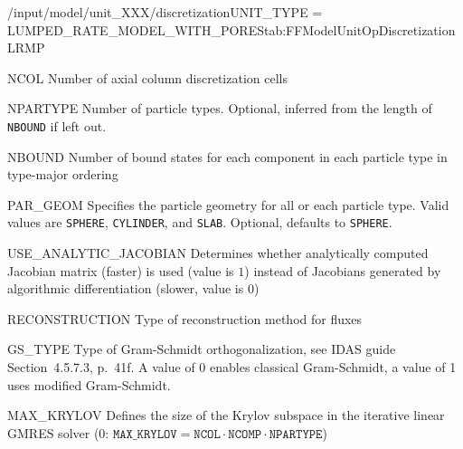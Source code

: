 \begin{condsubgroup}{/input/model/unit\_XXX/discretization}{UNIT\_TYPE = LUMPED\_RATE\_MODEL\_WITH\_PORES}{tab:FFModelUnitOpDiscretizationLRMP}
  \begin{dataset}[type=int,range={$\geq 1$},length=1]{NCOL}
    Number of axial column discretization cells
  \end{dataset}
  \begin{dataset}[type=int,range={$\geq 1$},length=1]{NPARTYPE}
    Number of particle types.
    Optional, inferred from the length of \texttt{NBOUND} if left out.
  \end{dataset}
  \begin{dataset}[type=int,range={$\geq 0$},length={\texttt{NCOMP} / $\texttt{NPARTYPE} \cdot \texttt{NCOMP}$}]{NBOUND}
    Number of bound states for each component in each particle type in type-major ordering
  \end{dataset}
  \begin{dataset}[type=string,range={$\{ \texttt{SPHERE}, \texttt{CYLINDER}, \texttt{SLAB} \}$},length={$1$ / \texttt{NPARTYPE}}]{PAR\_GEOM}
    Specifies the particle geometry for all or each particle type.
    Valid values are \texttt{SPHERE}, \texttt{CYLINDER}, and \texttt{SLAB}.
    Optional, defaults to \texttt{SPHERE}.
  \end{dataset}
  \begin{dataset}[type=int,range={$\{0, 1\}$},length=1]{USE\_ANALYTIC\_JACOBIAN}
    Determines whether analytically computed Jacobian matrix (faster) is used (value is $1$) instead of Jacobians generated by algorithmic differentiation (slower, value is $0$)
  \end{dataset}
  \begin{dataset}[type=string,range={\texttt{WENO}},length={1}]{RECONSTRUCTION}
    Type of reconstruction method for fluxes
  \end{dataset}
  \begin{dataset}[type=int,range={$\{0, 1\}$},length=1]{GS\_TYPE}
    Type of Gram-Schmidt orthogonalization, see IDAS guide Section~4.5.7.3, p.~41f.
    A value of $0$ enables classical Gram-Schmidt, a value of 1 uses modified Gram-Schmidt.
  \end{dataset}
  \begin{dataset}[type=int,range={$\{0, \dots, \texttt{NCOL} \cdot \texttt{NCOMP} \cdot \texttt{NPARTYPE} \}$},length=1]{MAX\_KRYLOV}
    Defines the size of the Krylov subspace in the iterative linear GMRES solver (0: $\texttt{MAX\_KRYLOV} = \texttt{NCOL} \cdot \texttt{NCOMP} \cdot \texttt{NPARTYPE}$)

\end{dataset}
\end{condsubgroup}
